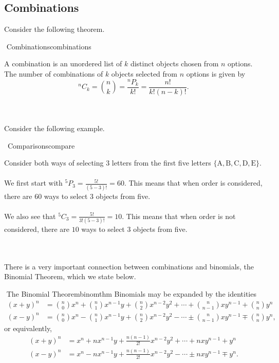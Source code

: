     \subsection{Combinations}

        Consider the following theorem.
        \begin{theorem}{\Stop\,\,Combinations}{combinations}

            A combination is an unordered list of \(k\) distinct objects chosen from \(n\) options. The number of combinations of \(k\) objects selected from \(n\) options is given by
            \begin{equation*}
                ^nC_k=\binom{n}{k}=\frac{^nP_k}{k!}=\frac{n!}{k!(n-k)!}.
            \end{equation*}
            
        \end{theorem}
        \vphantom
        \\
        \\
        Consider the following example.
        \begin{example}{\Difficulty\,\Difficulty\,\,Comparisons}{compare}

            Consider both ways of selecting \(3\) letters from the first five letters \(\{\text{A},\text{B},\text{C},\text{D},\text{E}\}\).
            \\
            \\
            We first start with \(^5P_3=\frac{5!}{(5-3)!}=60\). This means that when order is considered, there are \(60\) ways to select \(3\) objects from five.
            \\
            \\
            We also see that \(^5C_3=\frac{5!}{3!(5-3)!}=10\). This means that when order is not considered, there are \(10\) ways to select \(3\) objects from five.

        \end{example}
        \pagebreak
        \vphantom
        \\
        \\
        There is a very important connection between combinations and binomials, the Binomial Theorem, which we state below.
        \begin{theorem}{\Stop\,\,The Binomial Theorem}{binomthm}
            Binomials may be expanded by the identities
            \begin{align*}
                (x+y)^n&=\binom{n}{0}x^n+\binom{n}{1}x^{n-1}y+\binom{n}{2}x^{n-2}y^2+\cdots+\binom{n}{n-1}xy^{n-1}+\binom{n}{n}y^n \\
                (x-y)^n&=\binom{n}{0}x^n-\binom{n}{1}x^{n-1}y+\binom{n}{2}x^{n-2}y^2-\cdots\pm\binom{n}{n-1}xy^{n-1}\mp\binom{n}{n}y^n,
            \end{align*}
            or equivalently,
            \begin{align*}
                (x+y)^n&=x^n+nx^{n-1}y+\frac{n(n-1)}{2!}x^{n-2}y^2+\cdots+nxy^{n-1}+y^n \\
                (x-y)^n&=x^n-nx^{n-1}y+\frac{n(n-1)}{2!}x^{n-2}y^2-\cdots\pm nxy^{n-1}\mp y^n.
            \end{align*}

        \end{theorem}

